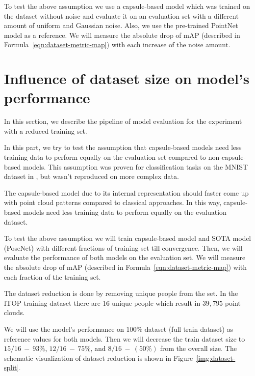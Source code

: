To test the above assumption we use a capsule-based model which was trained on the dataset without noise and evaluate it on an evaluation set with a different amount of uniform and Gaussian noise. Also, we use the pre-trained PointNet model as a reference.
We will measure the absolute drop of mAP (described in Formula~\ref{eqn:dataset-metric-map}) with each increase of the noise amount.

\section{Influence of dataset size on model's performance}
\label{s:influence-of-dataset-size-on-models-performance}

In this section, we describe the pipeline of model evaluation for the experiment with a reduced training set.

In this part, we try to test the assumption that capsule-based models need less training data to perform equally on the evaluation set compared to non-capsule-based models. This assumption was proven for classification tasks on the MNIST dataset in \cite{sabour_dynamic_2017}, but wasn't reproduced on more complex data.

The capsule-based model due to its internal representation should faster come up with point cloud patterns compared to classical approaches. In this way, capsule-based models need less training data to perform equally on the evaluation dataset.

To test the above assumption we will train capsule-based model and SOTA model (PoseNet) with different fractions of training set till convergence. Then, we will evaluate the performance of both models on the evaluation set. We will measure the absolute drop of mAP (described in Formula~\ref{eqn:dataset-metric-map}) with each fraction of the training set.

The dataset reduction is done by removing unique people from the set. In the ITOP training dataset there are 16 unique people which result in $39,795$ point clouds.

We will use the model's performance on $100\%$ dataset (full train dataset) as reference values for both models. Then we will decrease the train dataset size to $15/16 \  - \ 93\%$, $12/16 \  -\  75\%$, and $8/16 \ - \ (50\%)$ from the overall size. The schematic visualization of dataset reduction is shown in Figure~\ref{img:dataset-split}.

